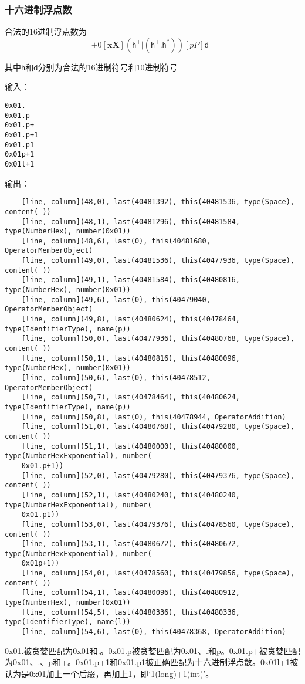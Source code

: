 \documentclass[UTF8]{ctexart}
\begin{document}
\subsubsection{十六进制浮点数}
合法的16进制浮点数为
$$
    \pm 0[\textbf{xX}] (\mathsf{h}^+|(\mathsf{h}^+.\mathsf{h}^*))[pP]\mathsf{d}^+
$$
\par 其中$\mathsf{h}$和$\mathsf{d}$分别为合法的16进制符号和10进制符号
\par 输入：
{\firacode
\begin{lstlisting}
0x01.
0x01.p
0x01.p+
0x01.p+1
0x01.p1
0x01p+1
0x01l+1
\end{lstlisting}
}
\par 输出：
{\firacode
\begin{lstlisting}
    [line, column](48,0), last(40481392), this(40481536, type(Space), content( ))
    [line, column](48,1), last(40481296), this(40481584, type(NumberHex), number(0x01))
    [line, column](48,6), last(0), this(40481680, OperatorMemberObject)
    [line, column](49,0), last(40481536), this(40477936, type(Space), content( ))
    [line, column](49,1), last(40481584), this(40480816, type(NumberHex), number(0x01))
    [line, column](49,6), last(0), this(40479040, OperatorMemberObject)
    [line, column](49,8), last(40480624), this(40478464, type(IdentifierType), name(p))
    [line, column](50,0), last(40477936), this(40480768, type(Space), content( ))
    [line, column](50,1), last(40480816), this(40480096, type(NumberHex), number(0x01))
    [line, column](50,6), last(0), this(40478512, OperatorMemberObject)
    [line, column](50,7), last(40478464), this(40480624, type(IdentifierType), name(p))
    [line, column](50,8), last(0), this(40478944, OperatorAddition)
    [line, column](51,0), last(40480768), this(40479280, type(Space), content( ))
    [line, column](51,1), last(40480000), this(40480000, type(NumberHexExponential), number(
    0x01.p+1))
    [line, column](52,0), last(40479280), this(40479376, type(Space), content( ))
    [line, column](52,1), last(40480240), this(40480240, type(NumberHexExponential), number(
    0x01.p1))
    [line, column](53,0), last(40479376), this(40478560, type(Space), content( ))
    [line, column](53,1), last(40480672), this(40480672, type(NumberHexExponential), number(
    0x01p+1))
    [line, column](54,0), last(40478560), this(40479856, type(Space), content( ))
    [line, column](54,1), last(40480096), this(40480912, type(NumberHex), number(0x01))
    [line, column](54,5), last(40480336), this(40480336, type(IdentifierType), name(l))
    [line, column](54,6), last(0), this(40478368, OperatorAddition)
\end{lstlisting}
}
0x01.被贪婪匹配为0x01和.。0x01.p被贪婪匹配为0x01、.和p。0x01.p+被贪婪匹配为0x01、.、p和+。0x01.p+1和0x01.p1被正确匹配为十六进制浮点数。0x01l+1被认为是0x01加上一个后缀，再加上1，即`1(long)+1(int)'。
\end{document}
